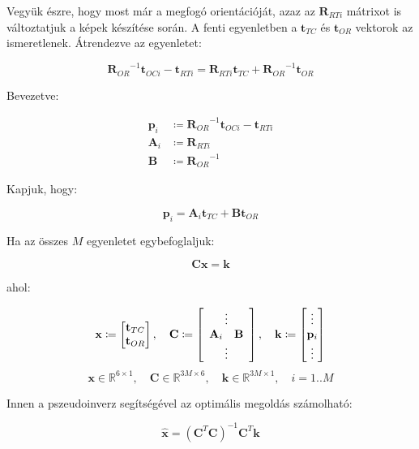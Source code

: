 	Vegyük észre, hogy most már a megfogó orientációját, azaz az $\mathbf{R}_{RTi}$ mátrixot is változtatjuk a képek készítése során. A fenti egyenletben a $\mathbf{t}_{TC}$ és $\mathbf{t}_{OR}$ vektorok az ismeretlenek. Átrendezve az egyenletet:
	
	\begin{equation}
	{\mathbf{R}_{OR}}^{-1} \mathbf{t}_{OCi} -  \mathbf{t}_{RTi} =  \mathbf{R}_{RTi}\mathbf{t}_{TC}+{\mathbf{R}_{OR}}^{-1}\mathbf{t}_{OR}
	\end{equation}
	
	Bevezetve:
	
	\begin{equation}
	\begin{split}
	\mathbf{p}_i &\coloneqq {\mathbf{R}_{OR}}^{-1} \mathbf{t}_{OCi} -  \mathbf{t}_{RTi} \\
	\mathbf{A}_i &\coloneqq  \mathbf{R}_{RTi} \\
	\mathbf{B} &\coloneqq  {\mathbf{R}_{OR}}^{-1}
	\end{split}
	\end{equation}
	
	Kapjuk, hogy:
	
	\begin{equation}
	\mathbf{p}_i =  \mathbf{A}_i\mathbf{t}_{TC}+\mathbf{B}\mathbf{t}_{OR}
	\end{equation}
	
	Ha az összes $M$ egyenletet egybefoglaljuk:
	
	\begin{equation}
	\mathbf{Cx} = \mathbf{k}
	\end{equation}
	
	ahol:
	
	\begin{equation}
	\mathbf{x} \coloneqq \left[ \begin{matrix} \mathbf{t}_{TC} \\ \mathbf{t}_{OR}\end{matrix}	 \right], \quad
	\mathbf{C} \coloneqq  \left[ \begin{array}{cc} \multicolumn{2}{c}{\vdots} \\ \mathbf{A}_i & \mathbf{B} \\ \multicolumn{2}{c}{\vdots}  \end{array} \right], \quad
	\mathbf{k} \coloneqq  \left[ \begin{matrix} \vdots \\ \mathbf{p}_i \\ \vdots \end{matrix} \right] 
	\end{equation}
	\begin{equation*}
	\mathbf{x} \in \mathbb{R}^{6 \times 1}, \quad
	\mathbf{C} \in \mathbb{R}^{3M \times 6}, \quad
	\mathbf{k} \in \mathbb{R}^{3M \times 1}, \quad
	i = 1..M
	\end{equation*}
	
	Innen a pszeudoinverz segítségével az optimális megoldás számolható:
	
	\begin{equation}
	\hat{\mathbf{x}} = \left(\mathbf{C}^T \mathbf{C}\right)^{-1}\mathbf{C}^T\mathbf{k}
	\end{equation}